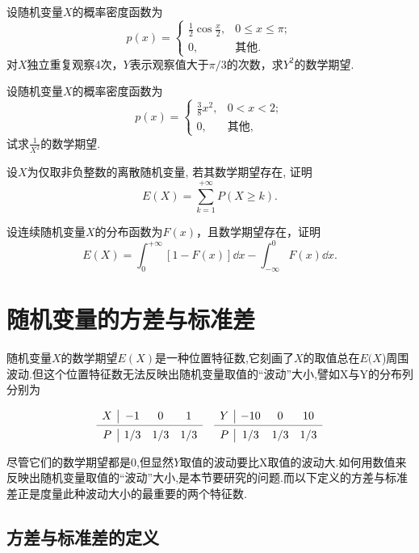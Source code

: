 \begin{xiti}
\item 设随机变量$X$的概率密度函数为
\[
  p(x)=\begin{cases}
    \frac{1}{2} \cos \frac{x}{2}, & 0 \leqslant x \leqslant \pi; \\
    0, & \text{其他}.
  \end{cases}
\]
对$X$独立重复观察4次，$Y$表示观察值大于$\pi/3$的次数，求$Y^2$的数学期望.

\item 设随机变量$X$的概率密度函数为
\[
  p(x) = \begin{cases}
    \frac38x^2, & 0 < x < 2; \\
    0, & \text{其他},
  \end{cases}
\]
试求$\frac1{X^2}$的数学期望.

\item 设$ X $为仅取非负整数的离散随机变量, 若其数学期望存在, 证明
\[
  E(X) = \sum_{k=1}^{+\infty}P(X \ge k).
\]

\item 设连续随机变量$X$的分布函数为$F(x)$，且数学期望存在，证明
\[
  E(X) = \int_{0}^{+\infty}[1-F(x)] \dd  x-\int_{-\infty}^{0} F(x) \dd  x.
\]

\end{xiti}

\section{随机变量的方差与标准差}


随机变量$ X $的数学期望$ E(X) $是一种位置特征数,它刻画了$ X $的取值总在$ E(X $)周围波动.但这个位置特征数无法反映出随机变量取值的“波动”大小,譬如X与Y的分布列分别为

\[
\begin{array}{c|ccccc|ccc}
X     & -1    & 0     & 1     &       & Y     & -10   & 0     & 10 \\
\cmidrule{1-4}\cmidrule{6-9}    P     & 1/3   & 1/3   & 1/3   &       & P     & 1/3   & 1/3   & 1/3 \\
\end{array}\]

尽管它们的数学期望都是0,但显然$ Y $取值的波动要比X取值的波动大.如何用数值来反映出随机变量取值的“波动”大小,是本节要研究的问题.而以下定义的方差与标准差正是度量此种波动大小的最重要的两个特征数.

\subsection{方差与标准差的定义}

